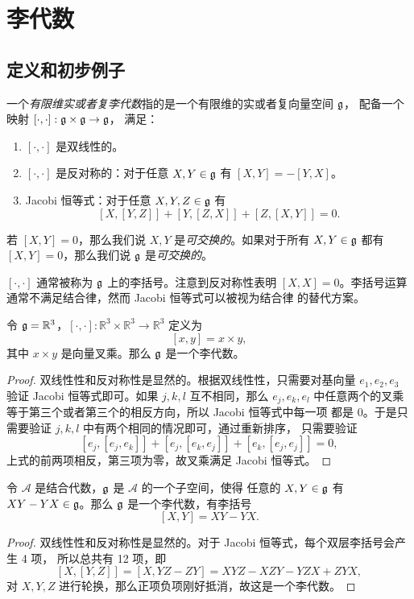 \chapter{李代数}

\section{定义和初步例子}

\begin{definition}
  一个\emph{有限维实或者复李代数}指的是一个有限维的实或者复向量空间 $\mathfrak{g}$，
  配备一个映射 $[\cdot,\cdot]:\mathfrak{g}\times \mathfrak{g}\to\mathfrak{g}$，
  满足：
  \begin{enumerate}
    \item $[\cdot,\cdot]$ 是双线性的。
    \item $[\cdot,\cdot]$ 是反对称的：对于任意 $X,Y\in\mathfrak{g}$ 有 $[X,Y]=-[Y,X]$。
    \item Jacobi 恒等式：对于任意 $X,Y,Z\in \mathfrak{g}$ 有 
    \[
      [X,[Y,Z]]+[Y,[Z,X]]+[Z,[X,Y]]=0.
    \]
  \end{enumerate}
  若 $[X,Y]=0$，那么我们说 $X,Y$ 是\emph{可交换的}。如果对于所有 $X,Y\in\mathfrak{g}$
  都有 $[X,Y]=0$，那么我们说 $\mathfrak{g}$ 是\emph{可交换的}。
\end{definition}

$[\cdot,\cdot]$ 通常被称为 $\mathfrak{g}$ 上的李括号。注意到反对称性表明
$[X,X]=0$。李括号运算通常不满足结合律，然而 Jacobi 恒等式可以被视为结合律
的替代方案。

\begin{example}
  令 $\mathfrak{g}= \mathbb{R}^3$，$[\cdot,\cdot]:\mathbb{R}^3\times \mathbb{R}^3\to \mathbb{R}^3$
  定义为
  \[
    [x,y]=x\times y,
  \]
  其中 $x\times y$ 是向量叉乘。那么 $\mathfrak{g}$ 是一个李代数。
\end{example}
\begin{proof}
  双线性性和反对称性是显然的。根据双线性性，只需要对基向量 $e_1,e_2,e_3$
  验证 Jacobi 恒等式即可。如果 $j,k,l$ 互不相同，那么 $e_j,e_k,e_l$ 
  中任意两个的叉乘等于第三个或者第三个的相反方向，所以 Jacobi 恒等式中每一项
  都是 $0$。于是只需要验证 $j,k,l$ 中有两个相同的情况即可，通过重新排序，
  只需要验证
  \[
    [e_j,[e_j,e_k]]+[e_j,[e_k,e_j]]+[e_k,[e_j,e_j]]=0,
  \]
  上式的前两项相反，第三项为零，故叉乘满足 Jacobi 恒等式。
\end{proof}

\begin{example}\label{exa:lie algebra of associative algebra}
  令 $\mathcal A$ 是结合代数，$\mathfrak{g}$ 是 $\mathcal A$ 的一个子空间，使得
  任意的 $X,Y\in\mathfrak{g}$ 有 $XY-YX\in\mathfrak{g}$。那么 $\mathfrak{g}$ 是一个李代数，有李括号
  \[
    [X,Y]=XY-YX.
  \]
\end{example}
\begin{proof}
  双线性性和反对称性是显然的。对于 Jacobi 恒等式，每个双层李括号会产生 4 项，
  所以总共有 12 项，即
  \[
    [X,[Y,Z]]=[X,YZ-ZY]=XYZ-XZY-YZX+ZYX,
  \]
  对 $X,Y,Z$ 进行轮换，那么正项负项刚好抵消，故这是一个李代数。
\end{proof}

